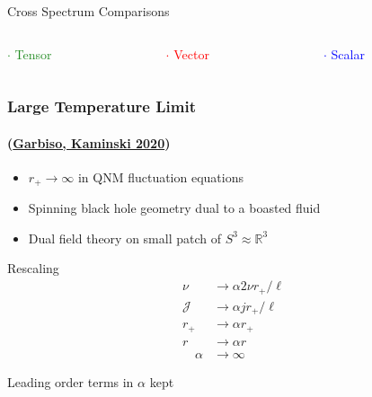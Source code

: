 \documentclass[xcolor=dvipsnames]{beamer}
\begin{document}
\begin{frame}{Cross Spectrum Comparisons}
  \vfill

  \begin{columns}[c]
    \begin{column}{0.33\textwidth}
      \textcolor{ForestGreen}{$\cdot$ Tensor}
    \end{column}

    \begin{column}{0.33\textwidth}
      \textcolor{red}{$\cdot$ Vector}
    \end{column}

    \begin{column}{0.33\textwidth}
      \textcolor{blue}{$\cdot$ Scalar}
    \end{column}
  \end{columns}
\end{frame}

\begin{frame}[squeeze]
  \frametitle{Large Temperature Limit}
  \framesubtitle{(\href{https://inspirehep.net/literature/1806001}{Garbiso, Kaminski 2020})}

  \begin{itemize}
    \item $r_+ \to \infty$ in QNM fluctuation equations
    \item Spinning black hole geometry dual to a boasted fluid
    \item Dual field theory on small patch of $S^3 \approx \mathbb{R}^3$
  \end{itemize}

  \begin{block}{Rescaling}
    \begin{equation*}
      \begin{aligned}
        \nu &\to \alpha 2\nu r_+/\ell \\
        \mathcal{J} &\to \alpha j r_+/\ell \\
        r_+ &\to \alpha r_+ \\
        r &\to \alpha r\\
        \quad \alpha&\to\infty
      \end{aligned}
    \end{equation*}
  \end{block}

  \begin{alertblock}{}
    Leading order terms in $\alpha$ kept
  \end{alertblock}

\end{frame}
\end{document}
